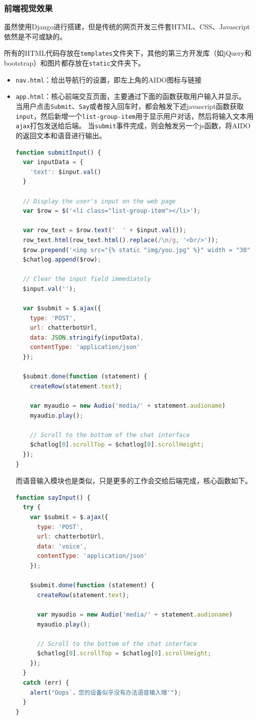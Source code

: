 \documentclass[logo,reportComp]{thesis}
\begin{document}
\subsubsection{前端视觉效果}
虽然使用Django进行搭建，但是传统的网页开发三件套HTML、CSS、Javascript依然是不可或缺的。

所有的HTML代码存放在\verb'templates'文件夹下，其他的第三方开发库（如jQuery和bootstrap）和图片都存放在\verb'static'文件夹下。

\begin{itemize}
\item \verb'nav.html'：给出导航行的设置，即左上角的AIDO图标与链接

\item \verb'app.html'：核心前端交互页面，主要通过下面的函数获取用户输入并显示。
当用户点击\verb'Submit'、\verb'Say'或者按入回车时，都会触发下述javascript函数获取\verb'input'，然后新增一个\verb'list-group-item'用于显示用户对话，然后将输入文本用\verb'ajax'打包发送给后端。
当\verb'submit'事件完成，则会触发另一个js函数，将AIDO的返回文本和语音进行输出。
\begin{lstlisting}[language=javascript]
function submitInput() {
  var inputData = {
    'text': $input.val()
  }

  // Display the user's input on the web page
  var $row = $('<li class="list-group-item"></li>');

  var row_text = $row.text('  ' + $input.val());
  row_text.html(row_text.html().replace(/\n/g, '<br/>'));
  $row.prepend('<img src="{% static "img/you.jpg" %}" width = "30" height = "30" class= "d-inline-block align-top" alt = "you" >');
  $chatlog.append($row);

  // Clear the input field immediately
  $input.val('');

  var $submit = $.ajax({
    type: 'POST',
    url: chatterbotUrl,
    data: JSON.stringify(inputData),
    contentType: 'application/json'
  });

  $submit.done(function (statement) {
    createRow(statement.text);

    var myaudio = new Audio('media/' + statement.audioname)
    myaudio.play();

    // Scroll to the bottom of the chat interface
    $chatlog[0].scrollTop = $chatlog[0].scrollHeight;
  });
}
\end{lstlisting}
而语音输入模块也是类似，只是更多的工作会交给后端完成，核心函数如下。
\begin{lstlisting}[language=javascript]
function sayInput() {
  try {
    var $submit = $.ajax({
      type: 'POST',
      url: chatterbotUrl,
      data: 'voice',
      contentType: 'application/json'
    });

    $submit.done(function (statement) {
      createRow(statement.text);

      var myaudio = new Audio('media/' + statement.audioname)
      myaudio.play();

      // Scroll to the bottom of the chat interface
      $chatlog[0].scrollTop = $chatlog[0].scrollHeight;
    });
  }
  catch (err) {
    alert("Oops`，您的设备似乎没有办法语音输入哦'");
  }
}
\end{lstlisting}
\end{itemize}
\end{document}
